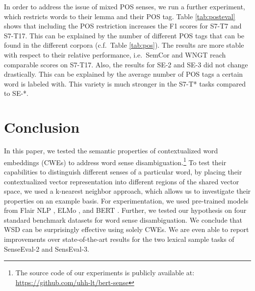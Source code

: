 \documentclass[11pt]{article}
\begin{document}
\begin{table}[t]
\centering
{}
\caption{Percentage of senses with a certain POS tag in the corpora.}\label{tab:pos}
\end{table}


In order to address the issue of mixed POS senses, we run a further experiment, which restricts words to their lemma and their POS tag.  
Table \ref{tab:posteval} shows that including the POS restriction increases the F1 scores for S7-T7 and S7-T17.
This can be explained by the number of different POS tags that can be found in the different corpora (c.f.\ Table \ref{tab:pos}).
The results are more stable with respect to their relative performance, i.e.\ SemCor and WNGT reach comparable scores on S7-T17.
Also, the results for SE-2 and SE-3 did not change drastically.
This can be explained by the average number of POS tags a certain word is labeled with.
This variety is much stronger in the S7-T* tasks compared to SE-*.


\section{Conclusion}
In this paper, we tested the semantic properties of contextualized word embeddings (CWEs) to address word sense disambiguation.\footnote{The source code of our experiments is publicly available at: \url{https://github.com/uhh-lt/bert-sense}}
To test their capabilities to distinguish different senses of a particular word, by placing their contextualized vector representation into different regions of the shared vector space, we used a k-nearest neighbor approach, which allows us to investigate their properties on an example basis.  
For experimentation, we used pre-trained models from Flair NLP \cite{akbik.2018}, ELMo \cite{peters.2018}, and BERT \cite{devlin.2019}.
Further, we tested our hypothesis on four standard benchmark datasets for word sense disambiguation.
We conclude that WSD can be surprisingly effective using solely CWEs.
We are even able to report improvements over state-of-the-art results for the two lexical sample tasks of SenseEval-2 and SensEval-3.
\end{document}
